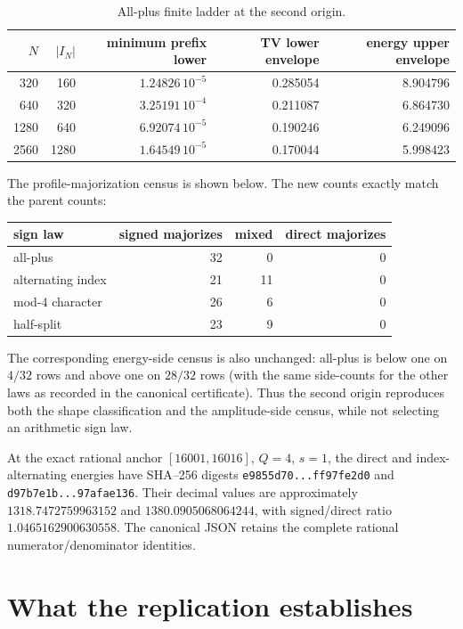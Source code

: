\documentclass[10pt]{article}
\begin{document}
\begin{table}[ht]
\centering
\caption{All-plus finite ladder at the second origin.}
\label{tab:ladder}
\small
\begin{tabular}{rrrrr}
\toprule
$N$ & $|I_N|$ & minimum prefix lower & TV lower envelope & energy upper envelope\\
\midrule
320  & 160  & $1.24826\,10^{-5}$ & 0.285054 & 8.904796\\
640  & 320  & $3.25191\,10^{-4}$ & 0.211087 & 6.864730\\
1280 & 640  & $6.92074\,10^{-5}$ & 0.190246 & 6.249096\\
2560 & 1280 & $1.64549\,10^{-5}$ & 0.170044 & 5.998423\\
\bottomrule
\end{tabular}
\end{table}

The profile-majorization census is shown below.  The new counts exactly
match the parent counts:
\begin{center}
\small
\begin{tabular}{lrrr}
\toprule
sign law & signed majorizes & mixed & direct majorizes\\
\midrule
all-plus & 32 & 0 & 0\\
alternating index & 21 & 11 & 0\\
mod-$4$ character & 26 & 6 & 0\\
half-split & 23 & 9 & 0\\
\bottomrule
\end{tabular}
\end{center}
The corresponding energy-side census is also unchanged: all-plus is below
one on $4/32$ rows and above one on $28/32$ rows (with the same
side-counts for the other laws as recorded in the canonical certificate).
Thus the second origin reproduces both the shape classification and the
amplitude-side census, while not selecting an arithmetic sign law.

At the exact rational anchor $[16001,16016]$, $Q=4$, $s=1$, the direct and
index-alternating energies have SHA--256 digests
\texttt{e9855d70...ff97fe2d0} and
\texttt{d97b7e1b...97afae136}.  Their decimal values are approximately
$1318.7472759963152$ and $1380.0905068064244$, with signed/direct ratio
$1.0465162900630558$.  The canonical JSON retains the complete rational
numerator/denominator identities.

\section{What the replication establishes}
\end{document}
